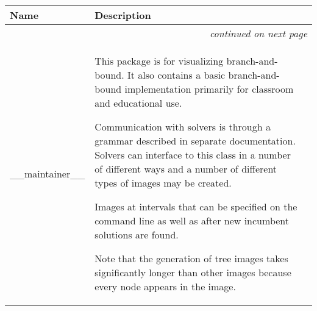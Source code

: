     \vspace{-1cm}
\hspace{\varindent}\begin{longtable}{|p{\varnamewidth}|p{\vardescrwidth}|l}
\cline{1-2}
\cline{1-2} \centering \textbf{Name} & \centering \textbf{Description}& \\
\cline{1-2}
\endhead\cline{1-2}\multicolumn{3}{r}{\small\textit{continued on next page}}\\\endfoot\cline{1-2}
\endlastfoot\raggedright \_\-\_\-m\-a\-i\-n\-t\-a\-i\-n\-e\-r\-\_\-\_\- & \raggedright This package is for visualizing branch-and-bound. It also 
          contains a basic branch-and-bound implementation primarily for 
          classroom and educational use.

          Communication with solvers is through a grammar described in 
          separate documentation. Solvers can interface to this class in a 
          number of different ways and a number of different types of 
          images may be created.

          Images at intervals that can be specified on the command line as 
          well as after new incumbent solutions are found.

          Note that the generation of tree images takes significantly 
          longer than other images because every node appears in the image.


\end{longtable}
